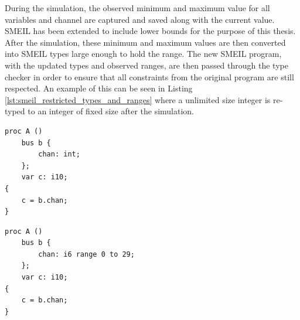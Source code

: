 During the simulation, the observed minimum and maximum value for all variables and channel are captured and saved along with the current value. SMEIL has been extended to include lower bounds for the purpose of this thesis.
After the simulation, these minimum and maximum values are then converted into SMEIL types large enough to hold the range.
The new SMEIL program, with the updated types and observed ranges, are then passed through the type checker in order to ensure that all constraints from the original program are still respected.
An example of this can be seen in Listing \ref{lst:smeil_restricted_types_and_ranges} where a unlimited size integer is re-typed to an integer of fixed size after the simulation.\\
\begin{minipage}[t]{.98\linewidth}
  \begin{minipage}[t]{0.45\linewidth}
    \begin{verbatim}
proc A ()
    bus b {
        chan: int;
    };
    var c: i10;
{
    c = b.chan;
}
    \end{verbatim}
    \label{lst:unconstrained_smeil_type}
  \end{minipage}
  \hspace{0.5cm}
  \begin{minipage}[t]{0.45\linewidth}
    \begin{verbatim}
proc A ()
    bus b {
        chan: i6 range 0 to 29;
    };
    var c: i10;
{
    c = b.chan;
}
    \end{verbatim}
    \label{lst:constrained_smeil_type}
  \end{minipage}
    \vspace{0.5cm}
   \label{lst:smeil_restricted_types_and_ranges}
   \vspace{1cm}
\end{minipage}
